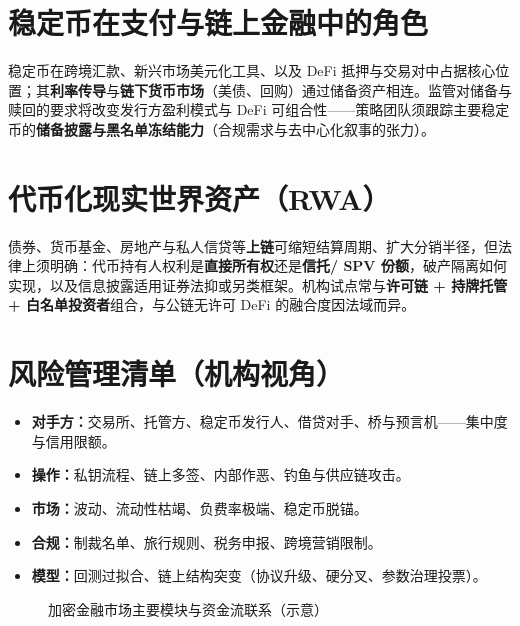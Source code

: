 \section{稳定币在支付与链上金融中的角色}

稳定币在跨境汇款、新兴市场美元化工具、以及 DeFi 抵押与交易对中占据核心位置；其\textbf{利率传导}与\textbf{链下货币市场}（美债、回购）通过储备资产相连。监管对储备与赎回的要求将改变发行方盈利模式与 DeFi 可组合性——策略团队须跟踪主要稳定币的\textbf{储备披露与黑名单冻结能力}（合规需求与去中心化叙事的张力）。

\section{代币化现实世界资产（RWA）}

债券、货币基金、房地产与私人信贷等\textbf{上链}可缩短结算周期、扩大分销半径，但法律上须明确：代币持有人权利是\textbf{直接所有权}还是\textbf{信托/ SPV 份额}，破产隔离如何实现，以及信息披露适用证券法抑或另类框架。机构试点常与\textbf{许可链 + 持牌托管 + 白名单投资者}组合，与公链无许可 DeFi 的融合度因法域而异。

\section{风险管理清单（机构视角）}

\begin{itemize}
  \item \textbf{对手方：}交易所、托管方、稳定币发行人、借贷对手、桥与预言机——集中度与信用限额。
  \item \textbf{操作：}私钥流程、链上多签、内部作恶、钓鱼与供应链攻击。
  \item \textbf{市场：}波动、流动性枯竭、负费率极端、稳定币脱锚。
  \item \textbf{合规：}制裁名单、旅行规则、税务申报、跨境营销限制。
  \item \textbf{模型：}回测过拟合、链上结构突变（协议升级、硬分叉、参数治理投票）。
\end{itemize}

\begin{figure}[htbp]
\centering
{}
\caption{加密金融市场主要模块与资金流联系（示意）}
\label{fig:crypto-mkt-map}
\end{figure}

